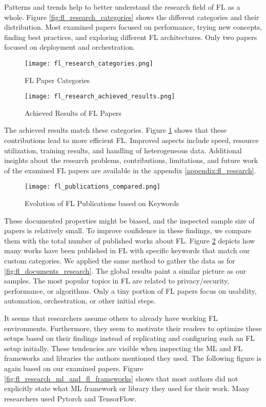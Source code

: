 Patterns and trends help to better understand the research field of FL as a whole.
Figure \ref{fig:fl_research_categories} shows the different categories and their distribution.
Most examined papers focused on performance, trying new concepts, finding best practices, and exploring different FL architectures.
Only two papers focused on deployment and orchestration.
\begin{figure}[p]
    \centering
    \texttt{[image: fl\_research\_categories.png]}
    \caption{FL Paper Categories}
    \label{fig:fl_research_categories}

    \texttt{[image: fl\_research\_achieved\_results.png]}
    \caption{Achieved Results of FL Papers}
    \label{fig:fl_research_achieved_results}
\end{figure}
The achieved results match these categories.
Figure \ref{fig:fl_research_achieved_results} shows that these contributions lead to more efficient FL.
Improved aspects include speed, resource utilization, training results, and handling of heterogeneous data.
Additional insights about the research problems, contributions, limitations, and future work of the examined FL papers are available in the appendix \ref{appendix:fl_research}.

\begin{figure}[H]
    \centering
    \texttt{[image: fl\_publications\_compared.png]}
    \caption{Evolution of FL Publications based on Keywords}
    \label{fig:fl_publications_compared}
\end{figure}

These documented properties might be biased, and the inspected sample size of papers is relatively small.
To improve confidence in these findings, we compare them with the total number of published works about FL.
Figure \ref{fig:fl_publications_compared} depicts how many works have been published in FL with specific keywords that match our custom categories.
We applied the same method to gather the data as for \ref{fig:fl_documents_research}.
The global results paint a similar picture as our samples.
The most popular topics in FL are related to privacy/security, performance, or algorithms.
Only a tiny portion of FL papers focus on usability, automation, orchestration, or other initial steps.

It seems that researchers assume others to already have working FL environments.
Furthermore, they seem to motivate their readers to optimize these setups based on their findings instead of replicating and configuring such an FL setup initially.
These tendencies are visible when inspecting the ML and FL frameworks and libraries the authors mentioned they used.
The following figure is again based on our examined papers.
Figure \ref{fig:fl_research_ml_and_fl_frameworks} shows that most authors did not explicitly state what ML framework or library they used for their work.
Many researchers used Pytorch and TensorFlow.

